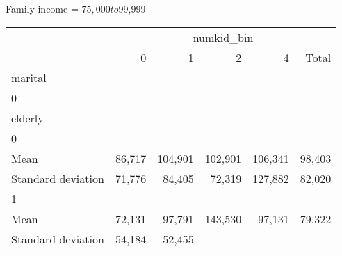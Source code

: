 Family income = $75,000 to $99,999
\begin{tabular}{llllll}
\cline{1-6}
\multicolumn{1}{c}{} &
  \multicolumn{5}{|c}{numkid\_bin} \\
\multicolumn{1}{c}{} &
  \multicolumn{1}{|r}{0} &
  \multicolumn{1}{r}{1} &
  \multicolumn{1}{r}{2} &
  \multicolumn{1}{r}{4} &
  \multicolumn{1}{r}{Total} \\
\cline{1-6}
\multicolumn{1}{l}{marital} &
  \multicolumn{1}{|r}{} &
  \multicolumn{1}{r}{} &
  \multicolumn{1}{r}{} &
  \multicolumn{1}{r}{} &
  \multicolumn{1}{r}{} \\
\multicolumn{1}{l}{\hspace{1em}0} &
  \multicolumn{1}{|r}{} &
  \multicolumn{1}{r}{} &
  \multicolumn{1}{r}{} &
  \multicolumn{1}{r}{} &
  \multicolumn{1}{r}{} \\
\multicolumn{1}{l}{\hspace{2em}elderly} &
  \multicolumn{1}{|r}{} &
  \multicolumn{1}{r}{} &
  \multicolumn{1}{r}{} &
  \multicolumn{1}{r}{} &
  \multicolumn{1}{r}{} \\
\multicolumn{1}{l}{\hspace{3em}0} &
  \multicolumn{1}{|r}{} &
  \multicolumn{1}{r}{} &
  \multicolumn{1}{r}{} &
  \multicolumn{1}{r}{} &
  \multicolumn{1}{r}{} \\
\multicolumn{1}{l}{\hspace{4em}Mean} &
  \multicolumn{1}{|r}{86,717} &
  \multicolumn{1}{r}{104,901} &
  \multicolumn{1}{r}{102,901} &
  \multicolumn{1}{r}{106,341} &
  \multicolumn{1}{r}{98,403} \\
\multicolumn{1}{l}{\hspace{4em}Standard deviation} &
  \multicolumn{1}{|r}{71,776} &
  \multicolumn{1}{r}{84,405} &
  \multicolumn{1}{r}{72,319} &
  \multicolumn{1}{r}{127,882} &
  \multicolumn{1}{r}{82,020} \\
\multicolumn{1}{l}{\hspace{3em}1} &
  \multicolumn{1}{|r}{} &
  \multicolumn{1}{r}{} &
  \multicolumn{1}{r}{} &
  \multicolumn{1}{r}{} &
  \multicolumn{1}{r}{} \\
\multicolumn{1}{l}{\hspace{4em}Mean} &
  \multicolumn{1}{|r}{72,131} &
  \multicolumn{1}{r}{97,791} &
  \multicolumn{1}{r}{143,530} &
  \multicolumn{1}{r}{97,131} &
  \multicolumn{1}{r}{79,322} \\
\multicolumn{1}{l}{\hspace{4em}Standard deviation} &
  \multicolumn{1}{|r}{54,184} &
  \multicolumn{1}{r}{52,455} &

\end{tabular}
